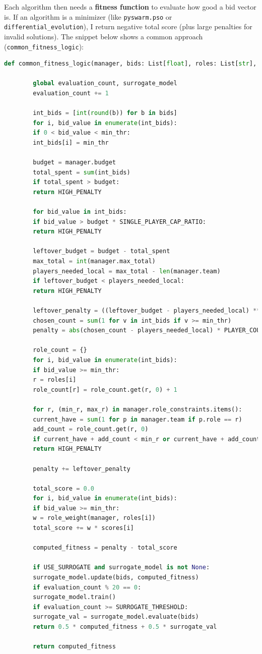 \documentclass[sigconf]{acmart}
\begin{document}
	Each algorithm then needs a \textbf{fitness function} to evaluate how good a bid vector is. If an algorithm is a minimizer (like \texttt{pyswarm.pso} or \texttt{differential\_evolution}), I return negative total score (plus large penalties for invalid solutions). The snippet below shows a common approach (\texttt{common\_fitness\_logic}):
	
	\begin{lstlisting}[language=Python, caption=Common fitness logic for PSO/DE/ES]
		def common_fitness_logic(manager, bids: List[float], roles: List[str], scores: List[float], min_thr: int) -> float:
		
		global evaluation_count, surrogate_model
		evaluation_count += 1
		
		int_bids = [int(round(b)) for b in bids]
		for i, bid_value in enumerate(int_bids):
		if 0 < bid_value < min_thr:
		int_bids[i] = min_thr
		
		budget = manager.budget
		total_spent = sum(int_bids)
		if total_spent > budget:
		return HIGH_PENALTY
		
		for bid_value in int_bids:
		if bid_value > budget * SINGLE_PLAYER_CAP_RATIO:
		return HIGH_PENALTY
		
		leftover_budget = budget - total_spent
		max_total = int(manager.max_total)
		players_needed_local = max_total - len(manager.team)
		if leftover_budget < players_needed_local:
		return HIGH_PENALTY
		
		leftover_penalty = ((leftover_budget - players_needed_local) ** BUDGET_LEFTOVER_EXP) * LEFTOVER_MULTIPLIER
		chosen_count = sum(1 for v in int_bids if v >= min_thr)
		penalty = abs(chosen_count - players_needed_local) * PLAYER_COUNT_PENALTY
		
		role_count = {}
		for i, bid_value in enumerate(int_bids):
		if bid_value >= min_thr:
		r = roles[i]
		role_count[r] = role_count.get(r, 0) + 1
		
		for r, (min_r, max_r) in manager.role_constraints.items():
		current_have = sum(1 for p in manager.team if p.role == r)
		add_count = role_count.get(r, 0)
		if current_have + add_count < min_r or current_have + add_count > max_r:
		return HIGH_PENALTY
		
		penalty += leftover_penalty
		
		total_score = 0.0
		for i, bid_value in enumerate(int_bids):
		if bid_value >= min_thr:
		w = role_weight(manager, roles[i])
		total_score += w * scores[i]
		
		computed_fitness = penalty - total_score
		
		if USE_SURROGATE and surrogate_model is not None:
		surrogate_model.update(bids, computed_fitness)
		if evaluation_count % 20 == 0:
		surrogate_model.train()
		if evaluation_count >= SURROGATE_THRESHOLD:
		surrogate_val = surrogate_model.evaluate(bids)
		return 0.5 * computed_fitness + 0.5 * surrogate_val
		
		return computed_fitness
	\end{lstlisting}
	
\end{document}
